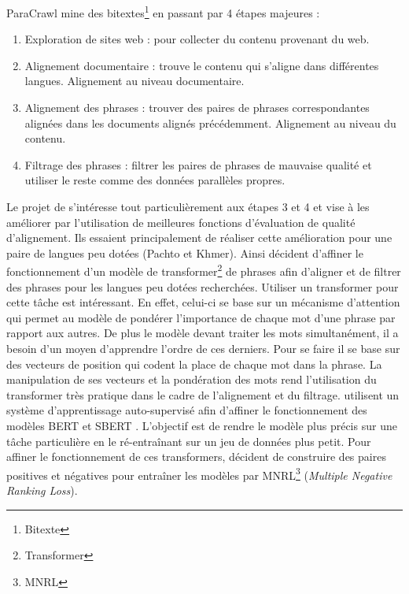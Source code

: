 ParaCrawl mine des bitextes\footnote{\gls{Bitexte}} en passant par 4 étapes majeures \citep{tan_2022} { :}
\begin{enumerate}
\item Exploration de sites web{ :} pour collecter du contenu provenant du web.
\item Alignement documentaire{ :} trouve le contenu qui s'aligne dans
différentes langues. Alignement au niveau documentaire.
\item Alignement des phrases{ :} trouver des paires de phrases correspondantes
alignées dans les documents alignés précédemment. Alignement au niveau du contenu.
\item Filtrage des phrases{ :} filtrer les paires de phrases de mauvaise qualité et
utiliser le reste comme des données parallèles propres.
\end{enumerate} 

Le projet de \citet{tan_2022} s'intéresse tout particulièrement aux étapes 3 et 4 et vise à les
améliorer par l'utilisation de meilleures fonctions d'évaluation de qualité d'alignement. Ils essaient 
principalement de réaliser
cette amélioration pour une paire de langues peu dotées (Pachto et Khmer). Ainsi \citet{tan_2022}
décident d'affiner le fonctionnement d'un modèle de transformer\footnote{\gls{Transformer}} de phrases 
afin d'aligner et de filtrer
des phrases pour les langues peu dotées recherchées.
Utiliser un transformer pour cette tâche est intéressant.
En effet, celui-ci se base sur un mécanisme d'attention qui permet au modèle de pondérer l’importance de chaque
mot d’une phrase par rapport aux autres. De plus le modèle devant traiter les mots simultanément, il a besoin
d’un moyen d’apprendre l’ordre de ces derniers. Pour se faire il se base sur des vecteurs de position qui codent la place de
chaque mot dans la phrase. La manipulation de ses vecteurs et la pondération des mots rend l'utilisation du
transformer très pratique dans le cadre de l'alignement et du filtrage.
\citet{tan_2022} utilisent un système d'apprentissage
auto-supervisé \citep{chen_2020, henderson_2017} afin d'affiner le fonctionnement des modèles BERT
\citep{devlin_2019} et \allowbreak SBERT \citep{reimers_2019}.
L'objectif est de rendre le modèle plus précis sur une tâche particulière en le ré-entraînant sur un jeu de données
plus petit. Pour affiner le fonctionnement de ces transformers,
\citet{tan_2022} décident de construire des paires positives et négatives pour entraîner les modèles par
MNRL\footnote{\gls{MNRL}} (\textit{Multiple Negative Ranking Loss}).

